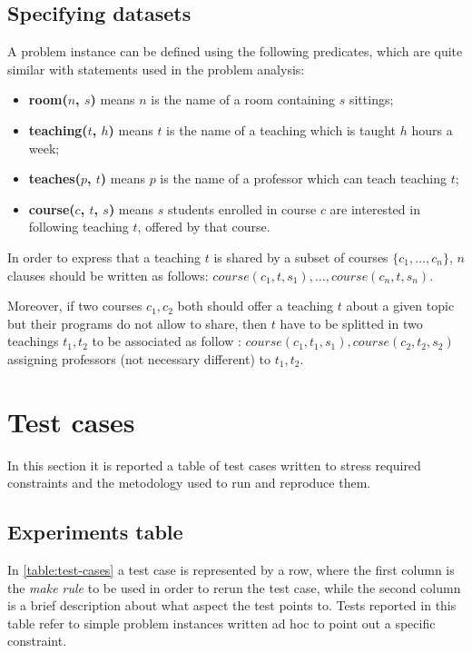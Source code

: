 \documentclass[10pt,a4paper]{article} %
\begin{document}
    \subsection{Specifying datasets}
    A problem instance can be defined using the following predicates, which
    are quite similar with statements used in the problem analysis:
    \begin{itemize}
        \item \textbf{room($n$, $s$)} means $n$ is the name
            of a room containing $s$ sittings;
        \item \textbf{teaching($t$, $h$)} means $t$ is the name
            of a teaching which is taught $h$ hours a week;
        \item \textbf{teaches($p$, $t$)} means $p$ is the name
            of a professor which can teach teaching $t$;
        \item \textbf{course($c$, $t$, $s$)} means $s$ students
            enrolled in course $c$ are interested in following
            teaching $t$, offered by that course.
    \end{itemize}
    In order to express that a teaching $t$ is shared by a subset of
    courses $\lbrace c_1, \ldots, c_n \rbrace$, $n$ clauses should be written
    as follows: $ course(c_1, t, s_1), \ldots, course(c_n, t, s_n)$.

    Moreover, if two courses $c_1, c_2$ both should offer a teaching $t$ about
    a given topic but their programs do not allow to share, then $t$
    have to be splitted in two teachings $t_1, t_2$ to be associated as follow :
    $course(c_1, t_1, s_1), course(c_2, t_2, s_2)$
    assigning professors (not necessary different) to $t_1, t_2$.

    \section{Test cases}
    In this section it is reported a table of test cases written to stress
    required constraints and the metodology used to run and reproduce them.

    \subsection{Experiments table}
    In \ref{table:test-cases} a test case is represented by a row, where
    the first column is the \emph{make rule} to be used in order to rerun the
    test case, while the second column is a brief description about what
    aspect the test points to. Tests reported in this table refer to simple
    problem instances written ad hoc to point out a specific constraint.
\end{document}
